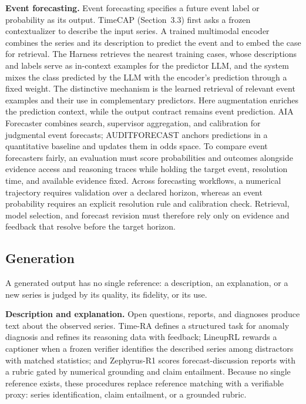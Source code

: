 \documentclass[preprints,article,submit,moreauthors]{Definitions/mdpi}
\begin{document}
\noindent\textbf{Event forecasting.} Event forecasting specifies a future event label or probability as its output. TimeCAP \citep{timecap2025} (Section~3.3) first asks a frozen contextualizer to describe the input series. A trained multimodal encoder combines the series and its description to predict the event and to embed the case for retrieval. The Harness retrieves the nearest training cases, whose descriptions and labels serve as in-context examples for the predictor LLM, and the system mixes the class predicted by the LLM with the encoder's prediction through a fixed weight.
The distinctive mechanism is the learned retrieval of relevant event examples and their use in complementary predictors. Here augmentation enriches the prediction context, while the output contract remains event prediction. AIA Forecaster \citep{aiaforecaster2025} combines search, supervisor aggregation, and calibration for judgmental event forecasts; AUDITFORECAST \citep{auditforecast2026} anchors predictions in a quantitative baseline and updates them in odds space. To compare event forecasters fairly, an evaluation must score probabilities and outcomes alongside evidence access and reasoning traces while holding the target event, resolution time, and available evidence fixed. Across forecasting workflows, a numerical trajectory requires validation over a declared horizon, whereas an event probability requires an explicit resolution rule and calibration check. Retrieval, model selection, and forecast revision must therefore rely only on evidence and feedback that resolve before the target horizon.

\subsection{Generation}
\label{sec:task-generation}

A generated output has no single reference: a description, an explanation, or a new series is judged by its quality, its fidelity, or its use.

\noindent\textbf{Description and explanation.} Open questions, reports, and diagnoses produce text about the observed series. Time-RA \citep{timera2025} defines a structured task for anomaly diagnosis and refines its reasoning data with feedback; LineupRL \citep{lineuprl2026} rewards a captioner when a frozen verifier identifies the described series among distractors with matched statistics; and Zephyrus-R1 \citep{zephyrusr12026} scores forecast-discussion reports with a rubric gated by numerical grounding and claim entailment. Because no single reference exists, these procedures replace reference matching with a verifiable proxy: series identification, claim entailment, or a grounded rubric.
\end{document}
